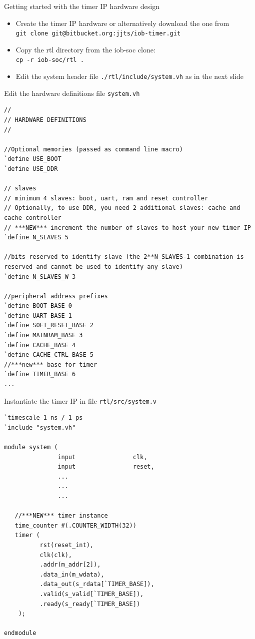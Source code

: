 \documentclass [xcolor=svgnames, t] {beamer}
\begin{document}
\begin{frame}{Getting started with the timer IP hardware design}
\begin{itemize}
\item Create the timer IP hardware or alternatively download the one from
  \\{\tt git clone git@bitbucket.org:jjts/iob-timer.git}
\item Copy the rtl directory from the iob-soc clone:
  \\{\tt cp -r iob-soc/rtl .}
\item Edit the system header file {\tt ./rtl/include/system.vh} as in the next slide\\
\end{itemize}
\end{frame}

\begin{frame}[fragile]{Edit the hardware definitions file {\tt system.vh}}
\begin{tiny}
\begin{lstlisting}
//
// HARDWARE DEFINITIONS
//

//Optional memories (passed as command line macro)
`define USE_BOOT
`define USE_DDR

// slaves
// minimum 4 slaves: boot, uart, ram and reset controller
// Optionally, to use DDR, you need 2 additional slaves: cache and cache controller
// ***NEW*** increment the number of slaves to host your new timer IP
`define N_SLAVES 5

//bits reserved to identify slave (the 2**N_SLAVES-1 combination is reserved and cannot be used to identify any slave)
`define N_SLAVES_W 3

//peripheral address prefixes
`define BOOT_BASE 0
`define UART_BASE 1
`define SOFT_RESET_BASE 2
`define MAINRAM_BASE 3
`define CACHE_BASE 4
`define CACHE_CTRL_BASE 5
//***new*** base for timer
`define TIMER_BASE 6
...
\end{lstlisting}
\end{tiny}
\end{frame}

\begin{frame}[fragile]{Instantiate the timer IP in file {\tt rtl/src/system.v}}
\begin{tiny}
\begin{lstlisting}
`timescale 1 ns / 1 ps
`include "system.vh"

module system (
               input                clk,
               input                reset,
               ...
               ...
               ...

   //***NEW*** timer instance
   time_counter #(.COUNTER_WIDTH(32))
   timer (
          rst(reset_int),
          clk(clk),
          .addr(m_addr[2]),
          .data_in(m_wdata),
          .data_out(s_rdata[`TIMER_BASE]),
          .valid(s_valid[`TIMER_BASE]),
          .ready(s_ready[`TIMER_BASE])
    );

endmodule

\end{lstlisting}
\end{tiny}
\end{frame}
\end{document}
